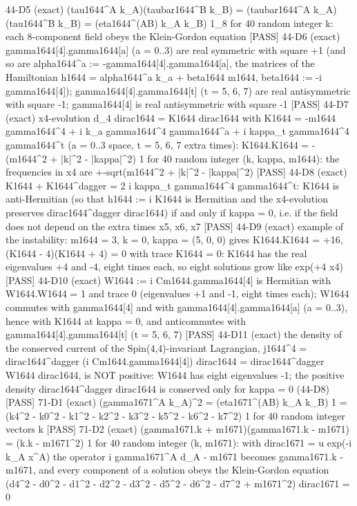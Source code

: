 \documentclass[
  10pt,
]{article}
\newenvironment{Shaded}{}{}
\newcommand{\NormalTok}[1]{#1}
\begin{document}
\begin{Shaded}
\begin{Highlighting}[]
\NormalTok{[PASS] 44{-}D5  (exact) (tau1644\^{}A k\_A)(taubar1644\^{}B k\_B) = (taubar1644\^{}A k\_A)(tau1644\^{}B k\_B) = (eta1644\^{}(AB) k\_A k\_B) 1\_8 for 40 random integer k: each 8{-}component field obeys the Klein{-}Gordon equation}
\NormalTok{[PASS] 44{-}D6  (exact) gamma1644[4].gamma1644[a] (a = 0..3) are real symmetric with square +1 (and so are alpha1644\^{}a := {-}gamma1644[4].gamma1644[a], the matrices of the Hamiltonian h1644 = alpha1644\^{}a k\_a + beta1644 m1644, beta1644 := {-}i gamma1644[4]); gamma1644[4].gamma1644[t] (t = 5, 6, 7) are real antisymmetric with square {-}1; gamma1644[4] is real antisymmetric with square {-}1}
\NormalTok{[PASS] 44{-}D7  (exact) x4{-}evolution d\_4 dirac1644 = K1644 dirac1644 with K1644 = {-}m1644 gamma1644\^{}4 + i k\_a gamma1644\^{}4 gamma1644\^{}a + i kappa\_t gamma1644\^{}4 gamma1644\^{}t (a = 0..3 space, t = 5, 6, 7 extra times): K1644.K1644 = {-}(m1644\^{}2 + |k|\^{}2 {-} |kappa|\^{}2) 1 for 40 random integer (k, kappa, m1644): the frequencies in x4 are +{-}sqrt(m1644\^{}2 + |k|\^{}2 {-} |kappa|\^{}2)}
\NormalTok{[PASS] 44{-}D8  (exact) K1644 + K1644\^{}dagger = 2 i kappa\_t gamma1644\^{}4 gamma1644\^{}t: K1644 is anti{-}Hermitian (so that h1644 := i K1644 is Hermitian and the x4{-}evolution preserves dirac1644\^{}dagger dirac1644) if and only if kappa = 0, i.e. if the field does not depend on the extra times x5, x6, x7}
\NormalTok{[PASS] 44{-}D9  (exact) example of the instability: m1644 = 3, k = 0, kappa = (5, 0, 0) gives K1644.K1644 = +16, (K1644 {-} 4)(K1644 + 4) = 0 with trace K1644 = 0: K1644 has the real eigenvalues +4 and {-}4, eight times each, so eight solutions grow like exp(+4 x4)}
\NormalTok{[PASS] 44{-}D10 (exact) W1644 := i Cm1644.gamma1644[4] is Hermitian with W1644.W1644 = 1 and trace 0 (eigenvalues +1 and {-}1, eight times each); W1644 commutes with gamma1644[4] and with gamma1644[4].gamma1644[a] (a = 0..3), hence with K1644 at kappa = 0, and anticommutes with gamma1644[4].gamma1644[t] (t = 5, 6, 7)}
\NormalTok{[PASS] 44{-}D11 (exact) the density of the conserved current of the Spin(4,4){-}invariant Lagrangian, j1644\^{}4 = dirac1644\^{}dagger (i Cm1644.gamma1644[4]) dirac1644 = dirac1644\^{}dagger W1644 dirac1644, is NOT positive: W1644 has eight eigenvalues {-}1; the positive density dirac1644\^{}dagger dirac1644 is conserved only for kappa = 0 (44{-}D8)}
\NormalTok{[PASS] 71{-}D1  (exact) (gamma1671\^{}A k\_A)\^{}2 = (eta1671\^{}(AB) k\_A k\_B) 1 = (k4\^{}2 {-} k0\^{}2 {-} k1\^{}2 {-} k2\^{}2 {-} k3\^{}2 {-} k5\^{}2 {-} k6\^{}2 {-} k7\^{}2) 1 for 40 random integer vectors k}
\NormalTok{[PASS] 71{-}D2  (exact) (gamma1671.k + m1671)(gamma1671.k {-} m1671) = (k.k {-} m1671\^{}2) 1 for 40 random integer (k, m1671): with dirac1671 = u exp({-}i k\_A x\^{}A) the operator i gamma1671\^{}A d\_A {-} m1671 becomes gamma1671.k {-} m1671, and every component of a solution obeys the Klein{-}Gordon equation (d4\^{}2 {-} d0\^{}2 {-} d1\^{}2 {-} d2\^{}2 {-} d3\^{}2 {-} d5\^{}2 {-} d6\^{}2 {-} d7\^{}2 + m1671\^{}2) dirac1671 = 0}

\end{Highlighting}
\end{Shaded}
\end{document}

